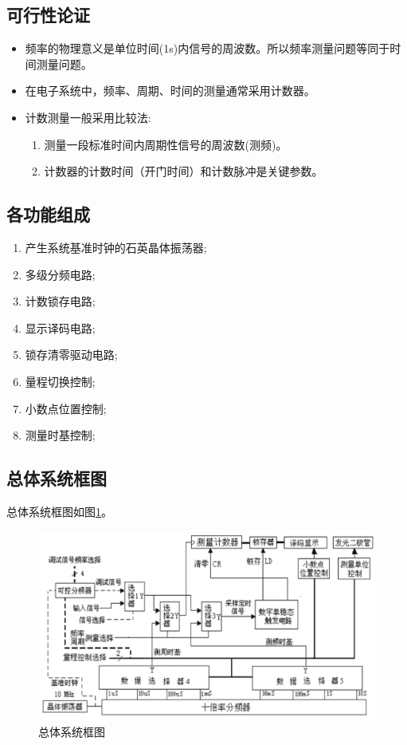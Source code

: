 \documentclass[12pt]{article}
\begin{document}
\subsection{可行性论证}

\begin{itemize}
    \item 频率的物理意义是单位时间(1s)内信号的周波数。所以频率测量问题等同于时间测量问题。
    \item 在电子系统中，频率、周期、时间的测量通常采用计数器。
    \item 计数测量一般采用比较法:
          \begin{enumerate}
              \item 测量一段标准时间内周期性信号的周波数(测频)。
              \item 计数器的计数时间（开门时间）和计数脉冲是关键参数。
          \end{enumerate}
\end{itemize}

\subsection{各功能组成}

\begin{enumerate}
    \item 产生系统基准时钟的石英晶体振荡器;
    \item 多级分频电路;
    \item 计数锁存电路;
    \item 显示译码电路;
    \item 锁存清零驱动电路;
    \item 量程切换控制;
    \item 小数点位置控制;
    \item 测量时基控制;
\end{enumerate}

\subsection*{总体系统框图}

总体系统框图如图\ref*{fig:system}。

\begin{figure}[H]
    \centering
    \includegraphics[width=1\textwidth]{./fig/system.png}
    \caption{总体系统框图}
    \label{fig:system}
\end{figure}
\end{document}

